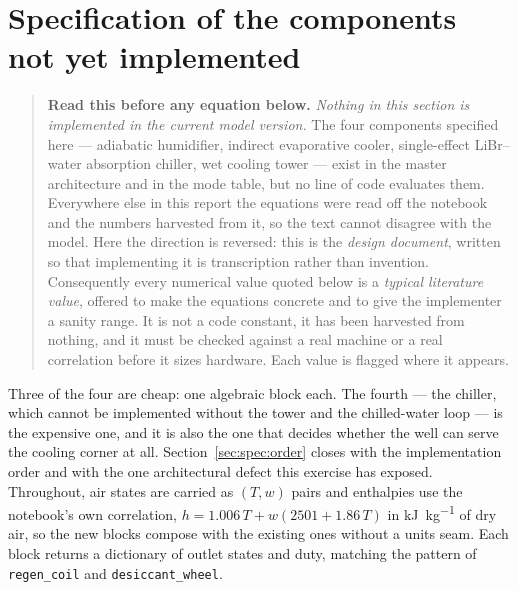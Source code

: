 \section{Specification of the components not yet implemented}\label{sec:spec:top}
\label{sec:spec:pending}

\begin{quote}
\textbf{Read this before any equation below.} \emph{Nothing in this section is implemented in the
current model version.} The four components specified here --- adiabatic humidifier, indirect
evaporative cooler, single-effect LiBr--water absorption chiller, wet cooling tower --- exist in the
master architecture and in the mode table, but no line of code evaluates them. Everywhere else in
this report the equations were read off the notebook and the numbers harvested from it, so the text
cannot disagree with the model. Here the direction is reversed: this is the \emph{design document},
written so that implementing it is transcription rather than invention. Consequently every numerical
value quoted below is a \emph{typical literature value}, offered to make the equations concrete and
to give the implementer a sanity range. It is not a code constant, it has been harvested from
nothing, and it must be checked against a real machine or a real correlation before it sizes
hardware. Each value is flagged where it appears.
\end{quote}

Three of the four are cheap: one algebraic block each. The fourth --- the chiller, which cannot be
implemented without the tower and the chilled-water loop --- is the expensive one, and it is also the
one that decides whether the well can serve the cooling corner at all.
Section~\ref{sec:spec:order} closes with the implementation order and with the one architectural
defect this exercise has exposed. Throughout, air states are carried as $(T,w)$ pairs and enthalpies
use the notebook's own correlation, $h = 1.006\,T + w(2501 + 1.86\,T)$ in
\si{\kilo\joule\per\kilogram} of dry air, so the new blocks compose with the existing ones without a
units seam. Each block returns a dictionary of outlet states and duty, matching the pattern of
\texttt{regen\_coil} and \texttt{desiccant\_wheel}.

